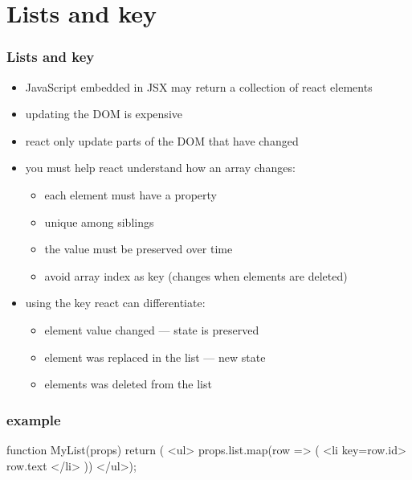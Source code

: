 \section{Lists and key}
\begin{frame}[fragile] \frametitle{Lists and key}
\begin{itemize}
  \item JavaScript embedded in JSX may return a collection of react elements
  \item updating the DOM is expensive
  \item react only update parts of the DOM that have changed
  \item you must help react understand how an array changes:
  \begin{itemize}
    \item each element must have a  property
    \item unique among siblings
    \item the value must be preserved over time
    \item avoid array index as key (changes when elements are deleted)
  \end{itemize}
  \item using the key react can differentiate:
  \begin{itemize}
    \item element value changed --- state is preserved
    \item element was replaced in the list --- new state
    \item elements was deleted from the list
  \end{itemize}
\end{itemize}
\end{frame}

\begin{frame}[fragile] \frametitle{ example}

\begin{CodeBox}{}
function MyList(props) { return (
  <ul>
    {props.list.map(row => (
      <li key={row.id}>
        {row.text}
      </li>
    ))}
  </ul>);
}
\end{CodeBox}
\end{frame}

